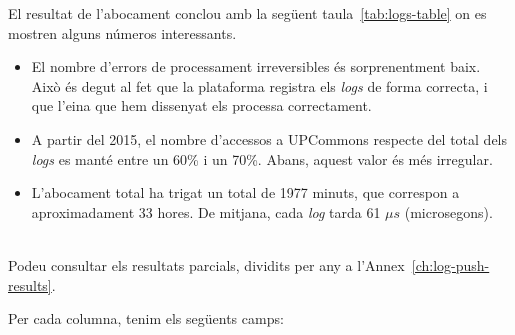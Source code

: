 \noindent
El resultat de l’abocament conclou amb la següent taula~\ref{tab:logs-table} on es mostren alguns números interessants.

\begin{itemize}
    \item El nombre d'errors de processament irreversibles és sorprenentment baix.
    Això és degut al fet que la plataforma registra els \textit{\gls{log}s} de forma correcta, i que l'eina que hem dissenyat els processa correctament.
    \item A partir del 2015, el nombre d'accessos a \gls{UPCommons} respecte del total dels \textit{\gls{log}s} es manté entre un 60\% i un 70\%.
    Abans, aquest valor és més irregular.
    \item L'abocament total ha trigat un total de 1977 minuts, que correspon a aproximadament 33 hores.
    De mitjana, cada \textit{\gls{log}} tarda 61 \(\mu s\) (microsegons).
\end{itemize}

\noindent \\
Podeu consultar els resultats parcials, dividits per any a l'Annex~\ref{ch:log-push-results}. \\



\clearpage

\noindent
Per cada columna, tenim els següents camps:

